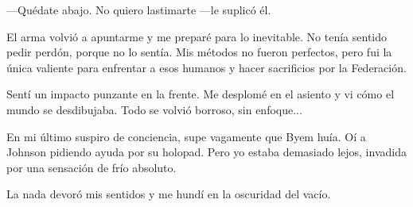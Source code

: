 —Quédate abajo. No quiero lastimarte —le suplicó él.

El arma volvió a apuntarme y me preparé para lo inevitable. No tenía sentido pedir perdón, porque no lo sentía. Mis métodos no fueron perfectos, pero fui la única valiente para enfrentar a esos humanos y hacer sacrificios por la Federación.

Sentí un impacto punzante en la frente. Me desplomé en el asiento y vi cómo el mundo se desdibujaba. Todo se volvió borroso, sin enfoque...

En mi último suspiro de conciencia, supe vagamente que Byem huía. Oí a Johnson pidiendo ayuda por su holopad. Pero yo estaba demasiado lejos, invadida por una sensación de frío absoluto.

La nada devoró mis sentidos y me hundí en la oscuridad del vacío.
